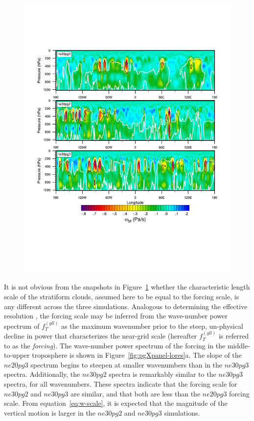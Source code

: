 \documentclass{agujournal}
\begin{document}
\begin{figure}[t]
\begin{center}
\noindent\includegraphics[width=30pc,angle=0]{figs/panel_transGLL.pdf}\\
\end{center}
\caption{}
\label{fig:transx}
\end{figure}

It is not obvious from the snapshots in Figure~\ref{fig:transx} whether the characteristic length scale of the stratiform clouds, assumed here to be equal to the forcing scale, is any different across the three simulations. Analogous to determining the effective resolution \citep{S2011LNCSE}, the forcing scale may be inferred from the wave-number power spectrum of $f_T^{(gll)}$ as the maximum wavenumber prior to the steep, un-physical decline in power that characterizes the near-grid scale (hereafter $f_T^{(gll)}$ is referred to as the {\em{forcing}}). The wave-number power spectrum of the forcing in the middle-to-upper troposphere is shown in Figure~\ref{fig:pgXpanel-lores}a. The slope of the $ne20pg3$ spectrum begins to steepen at smaller wavenumbers than in the $ne30pg3$ spectra. Additionally, the $ne30pg2$ spectra is remarkably similar to the $ne30pg3$ spectra, for all wavenumbers. These spectra indicate that the forcing scale for $ne30pg2$ and $ne30pg3$ are similar, and that both are less than the $ne20pg3$ forcing scale. From equation~\ref{eq:w-scale}, it is expected that the magnitude of the vertical motion is larger in the $ne30pg2$ and $ne30pg3$ simulations.
\end{document}
